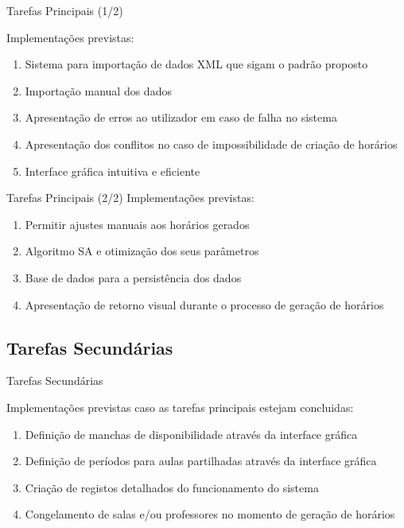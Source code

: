 \documentclass[aspectratio=169]{beamer}
\begin{document}
    \begin{frame}{Tarefas Principais (1/2)}
        \justifying

        Implementações previstas:
        \begin{enumerate}
            \item Sistema para importação de dados XML que sigam o padrão proposto
            \item Importação manual dos dados
            \item Apresentação de erros ao utilizador em caso de falha no sistema
            \item Apresentação dos conflitos no caso de impossibilidade de criação de horários
            \item Interface gráfica intuitiva e eficiente
            
            \setcounter{tarefasPrincipais}{\value{enumi}}
        \end{enumerate}
    \end{frame}

    \begin{frame}{Tarefas Principais (2/2)}
        \justifying
        Implementações previstas:
        \begin{enumerate}
            \setcounter{enumi}{\value{tarefasPrincipais}}

            \item Permitir ajustes manuais aos horários gerados
            \item Algoritmo SA e otimização dos seus parâmetros 
            \item Base de dados para a persistência dos dados
            \item Apresentação de retorno visual durante o processo de geração de horários
        \end{enumerate} %
    \end{frame}

    \subsection{Tarefas Secundárias}

    \begin{frame}{Tarefas Secundárias}
        \justifying

        Implementações previstas caso as tarefas principais estejam concluidas:
        \begin{enumerate}
            \item Definição de manchas de disponibilidade através da interface gráfica
            \item Definição de períodos para aulas partilhadas através da interface gráfica
            \item Criação de registos detalhados do funcionamento do sistema
            \item Congelamento de salas e/ou professores no momento de geração de horários
        \end{enumerate}
    \end{frame}

\end{document}
